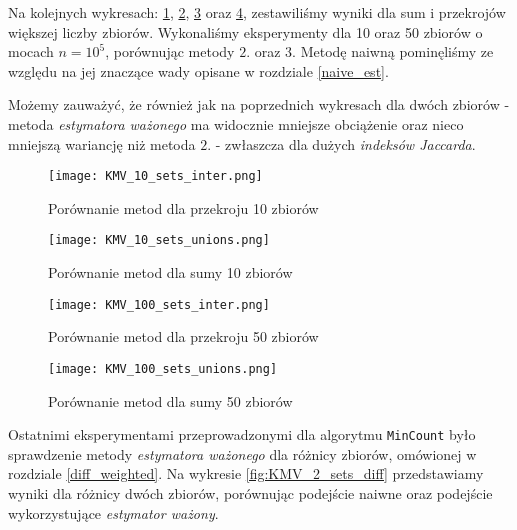 Na kolejnych wykresach: \ref{fig:KMV_10sets_inter}, \ref{fig:KMV_10sets_unions}, \ref{fig:KMV_100sets_inter} oraz \ref{fig:KMV_100sets_unions}, zestawiliśmy wyniki dla sum i przekrojów większej liczby zbiorów. Wykonaliśmy eksperymenty dla 10 oraz 50 zbiorów o mocach $n = 10^5$, porównując metody $2.$ oraz $3.$ Metodę naiwną pominęliśmy ze względu na jej znaczące wady opisane w rozdziale \ref{naive_est}. 

Możemy zauważyć, że również jak na poprzednich wykresach dla dwóch zbiorów - metoda \textit{estymatora ważonego} ma widocznie mniejsze obciążenie oraz nieco mniejszą wariancję niż metoda $2.$ - zwłaszcza dla dużych \textit{indeksów Jaccarda}.

\begin{figure}[h!]
    \texttt{[image: KMV\_10\_sets\_inter.png]}
    \centering
    \caption{Porównanie metod dla przekroju 10 zbiorów}
    \label{fig:KMV_10sets_inter}
\end{figure}

\begin{figure}[h!]
    \texttt{[image: KMV\_10\_sets\_unions.png]}
    \centering
    \caption{Porównanie metod dla sumy 10 zbiorów}
    \label{fig:KMV_10sets_unions}
\end{figure}

\begin{figure}[h!]
    \texttt{[image: KMV\_100\_sets\_inter.png]}
    \centering
    \caption{Porównanie metod dla przekroju 50 zbiorów}
    \label{fig:KMV_100sets_inter}
\end{figure}

\begin{figure}[h!]
    \texttt{[image: KMV\_100\_sets\_unions.png]}
    \centering
    \caption{Porównanie metod dla sumy 50 zbiorów}
    \label{fig:KMV_100sets_unions}
\end{figure}

Ostatnimi eksperymentami przeprowadzonymi dla algorytmu \texttt{MinCount} było sprawdzenie metody \textit{estymatora ważonego} dla różnicy zbiorów, omówionej w rozdziale \ref{diff_weighted}. Na wykresie \ref{fig:KMV_2_sets_diff} przedstawiamy wyniki dla różnicy dwóch zbiorów, porównując podejście naiwne oraz podejście wykorzystujące \textit{estymator ważony}.


